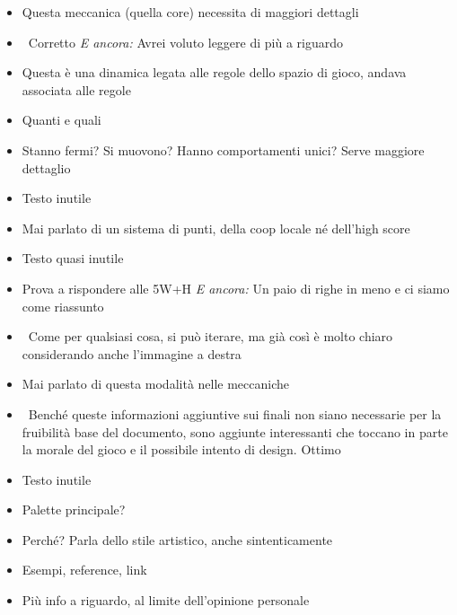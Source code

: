 {\begin{itemize}
  \item {} Questa meccanica (quella core) necessita di maggiori dettagli
  \item {} \rvBene\ Corretto \emph{E ancora:} Avrei voluto leggere di più a riguardo
  \item {} Questa è una dinamica legata alle regole dello spazio di gioco, andava associata alle regole
  \item {} Quanti e quali
  \item {} Stanno fermi? Si muovono? Hanno comportamenti unici? Serve maggiore dettaglio
  \item {} Testo inutile
  \item {} Mai parlato di un sistema di punti, della coop locale né dell'high score
  \item {} Testo quasi inutile
  \item {} Prova a rispondere alle 5W+H \emph{E ancora:} Un paio di righe in meno e ci siamo come riassunto
  \item {} \rvBene\ Come per qualsiasi cosa, si può iterare, ma già così è molto chiaro considerando anche l'immagine a destra
  \item {} Mai parlato di questa modalità nelle meccaniche
  \item {} \rvBene\ Benché queste informazioni aggiuntive sui finali non siano necessarie per la fruibilità base del documento, sono aggiunte interessanti che toccano in parte la morale del gioco e il possibile intento di design. Ottimo
  \item {} Testo inutile
  \item {} Palette principale?
  \item {} Perché? Parla dello stile artistico, anche sintenticamente
  \item {} Esempi, reference, link
  \item {} Più info a riguardo, al limite dell'opinione personale

\end{itemize}}
